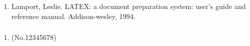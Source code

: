 \chapter{}

\subsection*{}

\begin{enumerate}
  \item Lamport, Leslie. LATEX: a document preparation system: user's guide and reference manual. Addison-wesley, 1994.
\end{enumerate}

\subsection*{}

\begin{enumerate}
  \item {} (No.12345678)
\end{enumerate}
